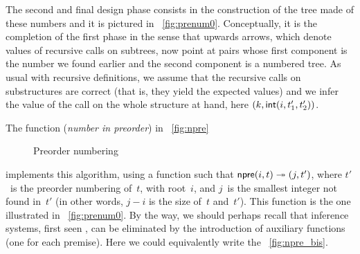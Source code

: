 The second and final design phase consists in the construction of the
tree made of these numbers and it is pictured in
\fig~\vref{fig:prenum0}. Conceptually, it is the completion of the
first phase in the sense that upwards arrows, which denote values of
recursive calls on subtrees, now point at pairs whose first component
is the number we found earlier and the second component is a numbered
tree. As usual with recursive definitions, we assume that the
recursive calls on substructures are correct (that is, they yield the
expected values) and we infer the value of the call on the whole
structure at hand, here \(({k},{\textsf{int}(i,t'_1,t'_2)})\).

The function  (\emph{number in
preorder}) in \fig~\vref{fig:npre}
\begin{figure}[b]
\centering
{}
\caption{Preorder numbering}
\label{fig:npre}
\end{figure}
implements this algorithm, using a function
 such that \(\textsf{npre}(i,t)
\twoheadrightarrow ({j},{t'})\), where \(t'\)~is the preorder
numbering of~\(t\), with root~\(i\), and \(j\)~is the smallest integer
not found in~\(t'\) (in other words, \(j-i\) is the size of~\(t\)
and~\(t'\)). This function is the one illustrated in
\fig~\vref{fig:prenum0}. By the way, we should perhaps recall that
inference systems, first seen
, can be eliminated by the introduction of
auxiliary functions (one for each premise). Here we could equivalently
write the \fig~\vref{fig:npre_bis}.
